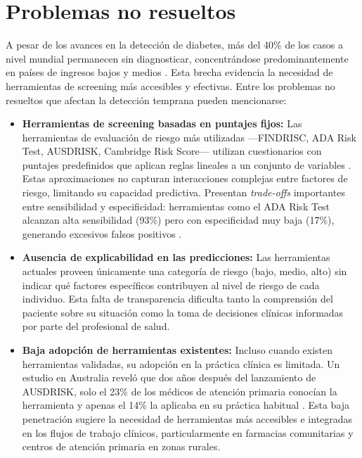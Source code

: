 \documentclass[12pt, a4paper]{report}
\begin{document}
\chapter{Problemas no resueltos}

A pesar de los avances en la detección de diabetes, más del 40\% de los casos a nivel mundial permanecen sin diagnosticar, concentrándose predominantemente en países de ingresos bajos y medios \citep{idf2025atlas}. Esta brecha evidencia la necesidad de herramientas de screening más accesibles y efectivas. Entre los problemas no resueltos que afectan la detección temprana pueden mencionarse:

\begin{itemize}
    \item \textbf{Herramientas de screening basadas en puntajes fijos:} Las herramientas de evaluación de riesgo más utilizadas —FINDRISC, ADA Risk Test, AUSDRISK, Cambridge Risk Score— utilizan cuestionarios con puntajes predefinidos que aplican reglas lineales a un conjunto de variables \citep{lindstrom2003findrisc, chen2010ausdrisk}. Estas aproximaciones no capturan interacciones complejas entre factores de riesgo, limitando su capacidad predictiva. Presentan \textit{trade-offs} importantes entre sensibilidad y especificidad: herramientas como el ADA Risk Test alcanzan alta sensibilidad (93\%) pero con especificidad muy baja (17\%), generando excesivos falsos positivos \citep{vanderwood2015evaluation}.

    \item \textbf{Ausencia de explicabilidad en las predicciones:} Las herramientas actuales proveen únicamente una categoría de riesgo (bajo, medio, alto) sin indicar qué factores específicos contribuyen al nivel de riesgo de cada individuo. Esta falta de transparencia dificulta tanto la comprensión del paciente sobre su situación como la toma de decisiones clínicas informadas por parte del profesional de salud.

    \item \textbf{Baja adopción de herramientas existentes:} Incluso cuando existen herramientas validadas, su adopción en la práctica clínica es limitada. Un estudio en Australia reveló que dos años después del lanzamiento de AUSDRISK, solo el 23\% de los médicos de atención primaria conocían la herramienta y apenas el 14\% la aplicaba en su práctica habitual \citep{wong2011ausdrisk}. Esta baja penetración sugiere la necesidad de herramientas más accesibles e integradas en los flujos de trabajo clínicos, particularmente en farmacias comunitarias y centros de atención primaria en zonas rurales.
\end{itemize}
\end{document}
